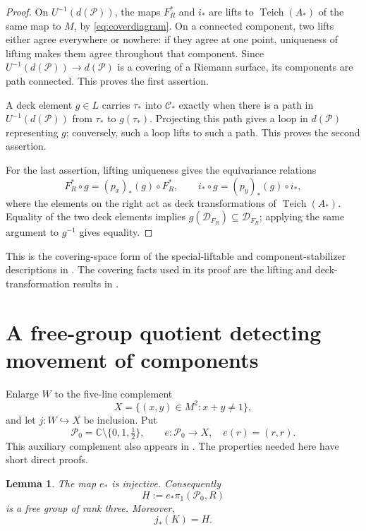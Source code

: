 \documentclass[11pt]{article}
\newcommand{\C}{\mathbb C}
\newcommand{\Teich}{\operatorname{Teich}}
\newcommand{\Def}{\mathcal D}
\newcommand{\Par}{\mathcal P}
\newtheorem{lemma}[theorem]{Lemma}
\theoremstyle{definition}
\theoremstyle{remark}
\begin{document}
\begin{proof}
On $U^{-1}(d(\Par))$, the maps $F_R^*$ and $i_*$ are lifts to
$\Teich(A_*)$ of the same map to $M$, by
\eqref{eq:coverdiagram}.  On a connected component, two lifts either
agree everywhere or nowhere: if they agree at one point, uniqueness
of lifting makes them agree throughout that component.
Since $U^{-1}(d(\Par))\to d(\Par)$ is a covering of a Riemann surface,
its components are path connected.  This proves the first assertion.

A deck element $g\in L$ carries $\tau_*$ into $\mathcal C_*$ exactly
when there is a path in $U^{-1}(d(\Par))$ from $\tau_*$ to
$g(\tau_*)$.  Projecting this path gives a loop in $d(\Par)$
representing $g$; conversely, such a loop lifts to such a path.
This proves the second assertion.

For the last assertion, lifting uniqueness gives the equivariance
relations
\[
F_R^*\circ g=(p_x)_*(g)\circ F_R^*,
\qquad
i_*\circ g=(p_y)_*(g)\circ i_*,
\]
where the elements on the right act as deck transformations of
$\Teich(A_*)$.  Equality of the two deck elements implies
$g(\Def_{F_R})\subseteq\Def_{F_R}$; applying the same argument to
$g^{-1}$ gives equality.
\end{proof}

This is the covering-space form of the special-liftable and
component-stabilizer descriptions in
\cite[Sections~2.8--2.9]{HK}.  The covering facts used in its proof are
the lifting and deck-transformation results in
\cite[Section~1.3, especially Proposition~1.39]{H}.

\section{A free-group quotient detecting movement of components}

Enlarge $W$ to the five-line complement
\[
X=\{(x,y)\in M^2:x+y\ne1\},
\]
and let $j:W\hookrightarrow X$ be inclusion.  Put
\[
\Par_0=\C\setminus\{0,1,\tfrac12\},\qquad
e:\Par_0\longrightarrow X,\quad e(r)=(r,r).
\]
This auxiliary complement also appears in
\cite[Section~2.12]{HK}.  The properties needed here have short direct
proofs.

\begin{lemma}\label{lem:freeimage}
The map $e_*$ is injective.  Consequently
\[
H:=e_*\pi_1(\Par_0,R)
\]
is a free group of rank three.  Moreover,
\begin{equation}\label{eq:imageK}
j_*(K)=H.
\end{equation}
\end{lemma}
\end{document}
